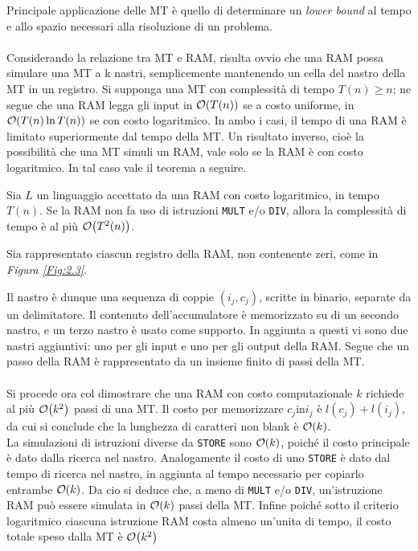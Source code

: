 \documentclass{article}
\begin{document}
Principale applicazione delle MT è quello di determinare un \emph{lower bound} al tempo e allo spazio necessari alla risoluzione di un problema.
\\ \\
Considerando la relazione tra MT e RAM, risulta ovvio che una RAM possa simulare una MT a k nastri, semplicemente mantenendo un cella del nastro della MT in un registro.
Si supponga una MT con complessità di tempo \(T(n) \ge n\); ne segue che una RAM legga gli input in \(\order{T(n)}\) se a costo uniforme,
in \(\order{T(n) \ln T(n)}\) se con costo logaritmico. In ambo i casi, il tempo di una RAM è limitato superiormente dal tempo della MT.
Un risultato inverso, cioè la possibilità che una MT simuli un RAM, vale solo se la RAM è con costo logaritmico.
In tal caso vale il teorema a seguire.

\begin{Theorem}
    Sia \(L\) un linguaggio accettato da una RAM con costo logaritmico, in tempo \(T(n)\).
    Se la RAM non fa uso di istruzioni \lstinline[language = RAM]{MULT} e/o \lstinline[language = RAM]{DIV}, allora la complessità di tempo è al più \(\order{T^{2}(n)}\).
\end{Theorem}

\begin{Proof*}
    Sia rappresentato ciascun registro della RAM, non contenente zeri, come in \emph{Figura \ref{Fig:2.3}}.
    

    \noindent Il nastro è dunque una sequenza di coppie \((i_{j}, c_{j})\), scritte in binario, separate da un delimitatore.
    Il contenuto dell'accumulatore è memorizzato su di un secondo nastro, e un terzo nastro è usato come supporto.
    In aggiunta a questi vi sono due nastri aggiuntivi: uno per gli input e uno per gli output della RAM.
    Segue che un passo della RAM è rappresentato da un insieme finito di passi della MT.
    \\ \\
    Si procede ora col dimostrare che una RAM con costo computazionale \(k\) richiede al più \(\order{k^{2}}\) passi di una MT.
    Il costo per memorizzare \(c_{j} \text{in} i_{j}\) è \(l(c_{j}) + l(i_{j})\), da cui si conclude che la lunghezza di caratteri non blank è \(\order{k}\).
    \\
    La simulazioni di istruzioni diverse da \lstinline[language = RAM]{STORE} sono \(\order{k}\), poiché il costo principale è dato dalla ricerca nel nastro.
    Analogamente il costo di uno \lstinline[language = RAM]{STORE} è dato dal tempo di ricerca nel nastro, in aggiunta al tempo necessario per copiarlo entrambe \(\order{k}\).
    Da cio si deduce che, a meno di \lstinline[language = RAM]{MULT} e/o \lstinline[language = RAM]{DIV}, un'istruzione RAM può essere simulata in \(\order{k}\) passi della MT.
    Infine poiché sotto il criterio logaritmico ciascuna istruzione RAM costa almeno un'unita di tempo, il costo totale speso dalla MT è \(\order{k^{2}}\)
\end{Proof*}
\end{document}

